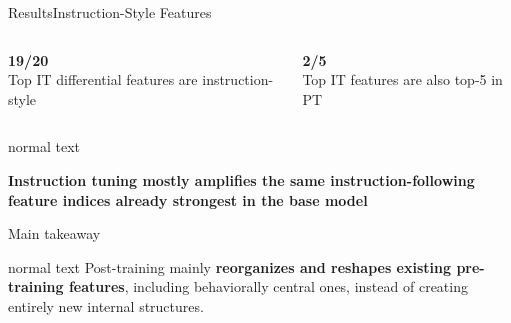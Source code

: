 \documentclass[aspectratio=169,11pt]{beamer}
\begin{document}
\begin{frame}{Results}{\textcolor{muted}{Instruction-Style Features}}
  \vspace{0.35cm}

  \begin{columns}[T,totalwidth=\textwidth]
    \begin{minipage}[t][1.18cm][t]{\linewidth}
      \centering
      {\fontsize{30}{34}\selectfont\bfseries 19/20}\\[0.10cm]
      {\small\color{muted}Top IT differential features are instruction-style}
    \end{minipage}

    \begin{minipage}[t][1.18cm][t]{\linewidth}
      \centering
      {\fontsize{30}{34}\selectfont\bfseries 2/5}\\[0.10cm]
      {\small\color{muted}Top IT features are also top-5 in PT}
    \end{minipage}
  \end{columns}

  \vfill

  \begin{beamercolorbox}[wd=\linewidth,sep=0.24cm,rounded=true]{normal text}
    {\centering\normalsize\color{accent}\textbf{Instruction tuning mostly amplifies the same instruction-following feature indices already strongest in the base model}\par}
  \end{beamercolorbox}

  \vfill
\end{frame}

\begin{frame}{Main takeaway}
  \begin{beamercolorbox}[wd=\linewidth,sep=0.3cm,rounded=true]{normal text}
    {\normalsize\color{inktwo}Post-training mainly \textbf{\color{accent}reorganizes and reshapes existing pre-training features}, including behaviorally central ones, instead of creating entirely new internal structures.}
  \end{beamercolorbox}
\end{frame}
\end{document}

